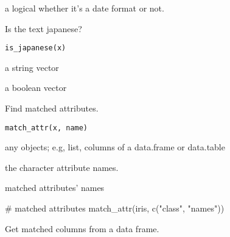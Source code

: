 \documentclass[letterpaper]{book}
\begin{document}
%
\begin{Value}
a logical whether it's a date format or not.
\end{Value}
%
\begin{Description}
Is the text japanese?
\end{Description}
%
\begin{Usage}
\begin{verbatim}
is_japanese(x)
\end{verbatim}
\end{Usage}
%
\begin{Arguments}
\begin{ldescription}
\item[\code{x}] a string vector
\end{ldescription}
\end{Arguments}
%
\begin{Value}
a boolean vector
\end{Value}
%
\begin{Description}
Find matched attributes.
\end{Description}
%
\begin{Usage}
\begin{verbatim}
match_attr(x, name)
\end{verbatim}
\end{Usage}
%
\begin{Arguments}
\begin{ldescription}
\item[\code{x}] any objects; e.g, list, columns of a data.frame or data.table

\item[\code{name}] the character attribute names.
\end{ldescription}
\end{Arguments}
%
\begin{Value}
matched attributes' names
\end{Value}
%
\begin{Examples}
\begin{ExampleCode}
# matched attributes
match_attr(iris, c("class", "names"))

\end{ExampleCode}
\end{Examples}
%
\begin{Description}
Get matched columns from a data frame.
\end{Description}
\end{document}
